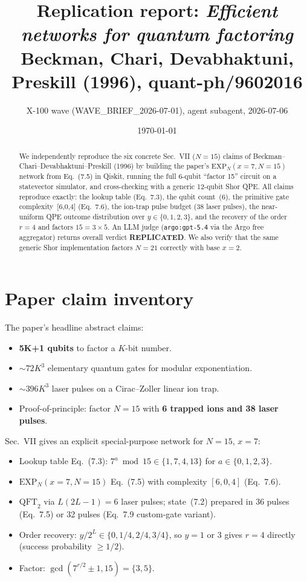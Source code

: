 \documentclass[11pt]{article}
\title{Replication report: \emph{Efficient networks for quantum factoring}\\
       \small Beckman, Chari, Devabhaktuni, Preskill (1996), quant-ph/9602016}
\author{X-100 wave (WAVE\_BRIEF\_2026-07-01), agent subagent, 2026-07-06}
\date{\today}
\begin{document}
\maketitle

\begin{abstract}
We independently reproduce the six concrete Sec.~VII (\(N{=}15\)) claims of
Beckman--Chari--Devabhaktuni--Preskill (1996) by building the paper's
\(\mathrm{EXP}_N(x{=}7, N{=}15)\) network from Eq.~(7.5) in Qiskit,
running the full 6-qubit ``factor 15'' circuit on a statevector simulator,
and cross-checking with a generic 12-qubit Shor QPE.  All claims
reproduce exactly: the lookup table (Eq.~7.3), the qubit count~(6),
the primitive gate complexity~[6,0,4] (Eq.~7.6), the ion-trap pulse
budget (38 laser pulses), the near-uniform QPE outcome distribution
over \(y\in\{0,1,2,3\}\), and the recovery of the order~\(r{=}4\) and
factors \(15 = 3\times 5\).  An LLM judge (\texttt{argo:gpt-5.4} via
the Argo free aggregator) returns overall verdict
\textbf{REPLICATED}.  We also verify that the same generic Shor
implementation factors \(N=21\) correctly with base \(x=2\).
\end{abstract}

\section{Paper claim inventory}

The paper's headline abstract claims:
\begin{itemize}
  \item \textbf{5K+1 qubits} to factor a \(K\)-bit number.
  \item \textbf{$\sim 72K^{3}$} elementary quantum gates for modular exponentiation.
  \item \textbf{$\sim 396K^{3}$} laser pulses on a Cirac--Zoller linear ion trap.
  \item Proof-of-principle: factor \(N=15\) with \textbf{6 trapped ions and 38 laser pulses}.
\end{itemize}

Sec.~VII gives an explicit special-purpose network for \(N=15\), \(x=7\):
\begin{itemize}
  \item Lookup table Eq.~(7.3): \(7^{a}\bmod 15 \in \{1,7,4,13\}\) for \(a\in\{0,1,2,3\}\).
  \item \(\mathrm{EXP}_N(x{=}7,N{=}15)\) Eq.~(7.5) with complexity \([6,0,4]\) (Eq.~7.6).
  \item \(\mathrm{QFT}_2\) via \(L(2L{-}1)=6\) laser pulses; state~(7.2) prepared in
        36 pulses (Eq.~7.5) or 32 pulses (Eq.~7.9 custom-gate variant).
  \item Order recovery: \(y/2^{L}\in\{0,1/4,2/4,3/4\}\), so \(y=1\) or 3
        gives \(r=4\) directly (success probability \(\ge 1/2\)).
  \item Factor: \(\gcd(7^{r/2}\pm 1, 15) = \{3, 5\}\).
\end{itemize}
\end{document}
